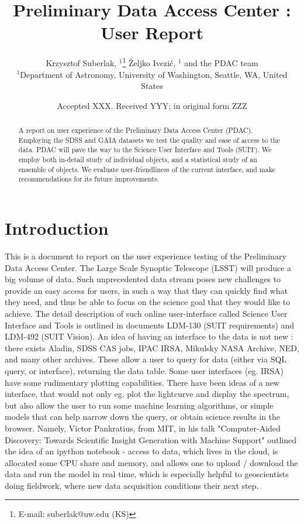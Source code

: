 \documentclass[fleqn,usenatbib]{mnras} %
\title[PDAC report]{Preliminary Data Access Center : User Report}
\author[K. Suberlak et al. ]{
Krzysztof Suberlak, $^{1}$\thanks{E-mail: suberlak@uw.edu (KS)}
\v{Z}eljko Ivezi\'c, $^{1}$ and the PDAC team  
\\
$^{1}$Department of Astronomy, University of Washington, Seattle, WA, United States\\
}
\date{Accepted XXX. Received YYY; in original form ZZZ}
\begin{document}
\label{firstpage}
\pagerange{\pageref{firstpage}--\pageref{lastpage}}
\maketitle

\begin{abstract}
A report on user experience of  the Preliminary Data Access Center (PDAC).  Employing the SDSS and GAIA datasets we test the quality and ease of access to the data. PDAC will pave the way to the Science User Interface and Tools  (SUIT).   We employ both in-detail study of individual objects, and a statistical study of an ensemble of objects. We evaluate user-friendliness of the current interface, and make recommendations for  its future improvements. 
\end{abstract}




\section{Introduction}

This is a document to report on the user experience testing of the Preliminary Data Access Center.  The Large Scale Synoptic Telescope (LSST)  will  produce a big volume of data. Such unprecedented data stream poses new challenges  to provide an easy access for users, in such a way that they can quickly find what they need, and thus be able to focus on the science goal that they would like to achieve.  The detail description of  such online user-interface called Science User Interface and Tools is outlined in documents LDM-130 (SUIT requirements)  and LDM-492  (SUIT Vision).  
An idea of having an interface to the data is not new : there exists Aladin,  SDSS CAS jobs,  IPAC  IRSA,  Mikulsky NASA Archive, NED, and many other archives. These allow a user to query for data (either via SQL query, or interface), returning the data table. Some user interfaces (eg. IRSA) have some rudimentary plotting capabilities.  There have been ideas of a new  interface, that would not only eg. plot the lightcurve and display the spectrum,  but also allow the user to run some machine learning algorithms, or simple models that can help narrow down the query, or obtain science results in the browser.  Namely, Victor Pankratius, from MIT, in his talk   "Computer-Aided Discovery: Towards Scientific Insight Generation with Machine Support"  outlined the idea of an ipython notebook - access to data, which lives in the cloud, is allocated some CPU  share and memory,  and allows one to upload / download the data and run the model in real time, which is especially helpful to geoscientists doing fieldwork, where new data acquisition conditions their next step.  
\end{document}
